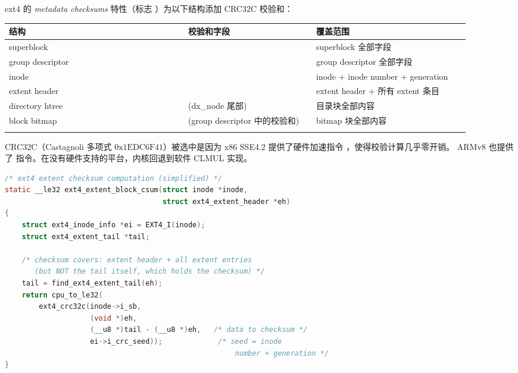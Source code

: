 \begin{filesystemlayout}
ext4 的 \emph{metadata checksums} 特性（标志
）为以下结构添加 CRC32C
校验和：

\begin{longtable}{|F{0.35\linewidth}|F{0.25\linewidth}|F{0.30\linewidth}|}
\toprule
{}
结构 & 校验和字段 & 覆盖范围 \\
\midrule
\endhead
\bottomrule
\endfoot
superblock &  & superblock 全部字段 \\\tablerowrule
group descriptor &  & group descriptor 全部字段 \\\tablerowrule
inode &  & inode + inode number + generation \\\tablerowrule
extent header &  & extent header + 所有 extent 条目 \\\tablerowrule
directory htree &  (dx\_node 尾部) & 目录块全部内容 \\\tablerowrule
block bitmap & (group descriptor 中的校验和) & bitmap 块全部内容 \\\tablerowrule
\end{longtable}

CRC32C（Castagnoli 多项式 $0\text{x}1\text{EDC}6\text{F}41$）被选中是因为
x86 SSE4.2 提供了硬件加速指令 ，使得校验计算几乎零开销。
ARMv8 也提供了  指令。在没有硬件支持的平台，内核回退到软件
CLMUL 实现。

\begin{lstlisting}[language=C]
/* ext4 extent checksum computation (simplified) */
static __le32 ext4_extent_block_csum(struct inode *inode,
                                     struct ext4_extent_header *eh)
{
    struct ext4_inode_info *ei = EXT4_I(inode);
    struct ext4_extent_tail *tail;

    /* checksum covers: extent header + all extent entries
       (but NOT the tail itself, which holds the checksum) */
    tail = find_ext4_extent_tail(eh);
    return cpu_to_le32(
        ext4_crc32c(inode->i_sb,
                    (void *)eh,
                    (__u8 *)tail - (__u8 *)eh,   /* data to checksum */
                    ei->i_crc_seed));             /* seed = inode
                                                      number + generation */
}
\end{lstlisting}


\end{filesystemlayout}

